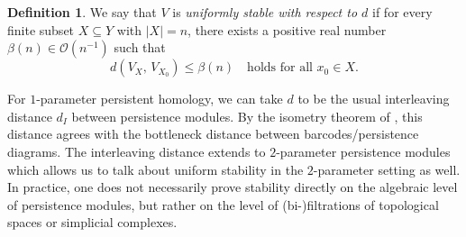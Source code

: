 \documentclass[10pt,a4paper]{article}
\theoremstyle{definition}
\newtheorem{defn}[thm]{Definition}
\begin{document}
\begin{defn}\label{def_uniform_stability}
	We say that $V$ is \textit{uniformly stable with respect to $d$} if for every finite subset $X\subseteq Y$ with $|X|=n$, there exists a positive real number $\beta(n)\in\mathcal{O}(n^{-1})$ such that
	\begin{equation}\label{eq_uniform_stability}
		 d\left(V_X,\,V_{X_0}\right) \leqslant \beta(n)\quad\text{holds for all }x_0\in X.
	\end{equation}
\end{defn}

For $1$-parameter persistent homology, we can take $d$ to be the usual interleaving distance $d_I$ between persistence modules. By the isometry theorem of \autocite{Bauer2015}, this distance agrees with the bottleneck distance between barcodes/persistence diagrams. The interleaving distance extends to $2$-parameter persistence modules which allows us to talk about uniform stability in the $2$-parameter setting as well. In practice, one does not necessarily prove stability directly on the algebraic level of persistence modules, but rather on the level of (bi-)filtrations of topological spaces or simplicial complexes.
\end{document}
